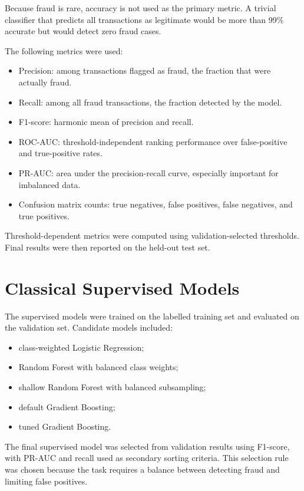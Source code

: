 \documentclass[12pt,a4paper]{report}
\begin{document}
Because fraud is rare, accuracy is not used as the primary metric. A trivial classifier that predicts all transactions as legitimate would be more than 99\% accurate but would detect zero fraud cases.

The following metrics were used:

\begin{itemize}
    \item Precision: among transactions flagged as fraud, the fraction that were actually fraud.
    \item Recall: among all fraud transactions, the fraction detected by the model.
    \item F1-score: harmonic mean of precision and recall.
    \item ROC-AUC: threshold-independent ranking performance over false-positive and true-positive rates.
    \item PR-AUC: area under the precision-recall curve, especially important for imbalanced data.
    \item Confusion matrix counts: true negatives, false positives, false negatives, and true positives.
\end{itemize}

Threshold-dependent metrics were computed using validation-selected thresholds. Final results were then reported on the held-out test set.

\section{Classical Supervised Models}

The supervised models were trained on the labelled training set and evaluated on the validation set. Candidate models included:

\begin{itemize}
    \item class-weighted Logistic Regression;
    \item Random Forest with balanced class weights;
    \item shallow Random Forest with balanced subsampling;
    \item default Gradient Boosting;
    \item tuned Gradient Boosting.
\end{itemize}

The final supervised model was selected from validation results using F1-score, with PR-AUC and recall used as secondary sorting criteria. This selection rule was chosen because the task requires a balance between detecting fraud and limiting false positives.
\end{document}
